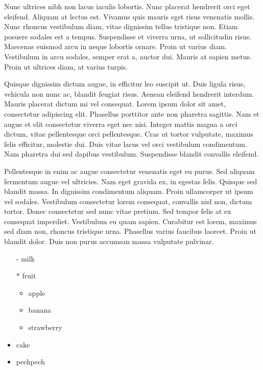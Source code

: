 \documentclass[a4paper,12pt]{article}
\begin{document}
	Nunc ultrices nibh non lacus iaculis lobortis. Nunc placerat hendrerit orci eget eleifend. Aliquam at lectus est. Vivamus quis mauris eget risus venenatis mollis. Nunc rhoncus vestibulum diam, vitae dignissim tellus tristique non. Etiam posuere sodales est a tempus. Suspendisse et viverra urna, ut sollicitudin risus. Maecenas euismod arcu in neque lobortis ornare. Proin ut varius diam. Vestibulum in arcu sodales, semper erat a, auctor dui. Mauris at sapien metus. Proin ut ultrices diam, at varius turpis.
	
	Quisque dignissim dictum augue, in efficitur leo suscipit ut. Duis ligula risus, vehicula non nunc ac, blandit feugiat risus. Aenean eleifend hendrerit interdum. Mauris placerat dictum mi vel consequat. Lorem ipsum dolor sit amet, consectetur adipiscing elit. Phasellus porttitor ante non pharetra sagittis. Nam et augue et elit consectetur viverra eget nec nisi. Integer mattis magna a orci dictum, vitae pellentesque orci pellentesque. Cras ut tortor vulputate, maximus felis efficitur, molestie dui. Duis vitae lacus vel orci vestibulum condimentum. Nam pharetra dui sed dapibus vestibulum. Suspendisse blandit convallis eleifend.
	
	Pellentesque in enim ac augue consectetur venenatis eget eu purus. Sed aliquam fermentum augue vel ultricies. Nam eget gravida ex, in egestas felis. Quisque sed blandit massa. In dignissim condimentum aliquam. Proin ullamcorper ut ipsum vel sodales. Vestibulum consectetur lorem consequat, convallis nisl non, dictum tortor. Donec consectetur sed nunc vitae pretium. Sed tempor felis at ex consequat imperdiet. Vestibulum eu quam sapien. Curabitur est lorem, maximus sed diam non, rhoncus tristique urna. Phasellus varius faucibus laoreet. Proin ut blandit dolor. Duis non purus accumsan massa vulputate pulvinar.
	
	\begin{itemize}
		\item[-] milk
		\item[*] fruit
		\begin{itemize}
			\item apple
			\item banana
			\item strawberry
		\end{itemize}
		\item cake
		\item pechpech

	\end{itemize}
\end{document}
